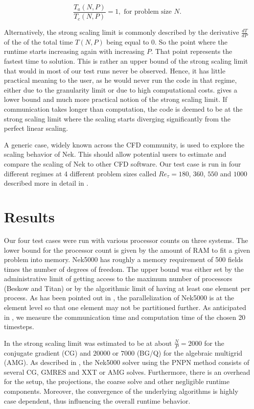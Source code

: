 \documentclass{sig-alternate}
\begin{document}
\begin{equation}
  \dfrac{T_a(N,P)}{T_c(N,P)}=1,\mbox{ for problem size }N.
  \label{eq:strong}
\end{equation} 

\noindent Alternatively, the strong scaling limit is commonly described by the
derivative $\frac{dT}{dP}$ of the
of the total time $T(N,P)$ being equal to $0$. So the point where the runtime
starts increasing again with increasing $P$. That point represents the fastest
time to solution. This is rather an upper bound of the strong scaling
limit that would in most of our test runs never be observed. Hence, it has
little practical meaning to the user, as he would never run the code in that
regime, either due to the granularity limit or due to high computational costs.  gives a lower bound and much more practical notion of the strong
scaling limit. If communication takes longer than
computation, the code is deemed to be at the strong scaling limit where the
scaling starts diverging significantly from the perfect linear scaling. 

A generic case, widely known across the CFD community, is used to explore the
scaling behavior of Nek. This should allow potential users to estimate and
compare the scaling of Nek to other CFD software.
Our test case is run in four different regimes at 4 different problem sizes called
$Re_{\tau} = 180$, $360$, $550$ and $1000$ described more in
detail in .

\section{Results}

Our four test cases were run with various processor counts on three systems. The
lower bound for the processor count is given by the amount of RAM to fit a given
problem into memory. Nek5000 has roughly a memory requirement of 500 fields
times the number of degrees of freedom. The upper bound was either set by the
administrative limit of getting access to the maximum number of processors
(Beskow and Titan) or by the algorithmic limit of having at least one element per process. As has
been pointed out in , the parallelization of Nek5000 is at the
element level so that one element may not be partitioned further. 
As anticipated in , we measure the communication time and
computation time of the chosen 20 timesteps. 

In \cite{fischer:scaling} the strong scaling limit  was estimated
to be at about $\frac{N}{P}=2000$ for the conjugate gradient (CG) and $20000$ or
$7000$ (BG/Q) for the algebraic multigrid (AMG). As described in , the
Nek5000 solver using the PNPN method consists of several CG, GMRES and XXT or AMG solves. Furthermore,
there is an overhead for the setup, the projections, the coarse solve and other
negligible runtime components. Moreover, the convergence of the underlying
algorithms is highly case dependent, thus influencing the overall runtime
behavior. 
\end{document}
